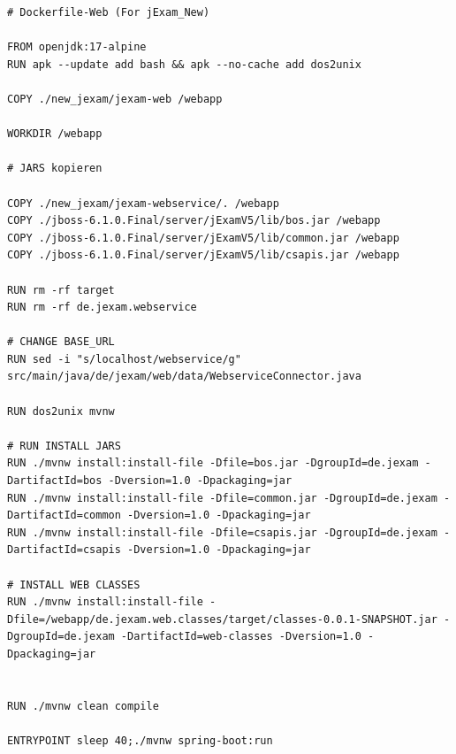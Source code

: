 \begin{lstlisting}[label={lst:docker-file-web}, caption={Dockerfile Datei des jExam_New Container}]
# Dockerfile-Web (For jExam_New)

FROM openjdk:17-alpine
RUN apk --update add bash && apk --no-cache add dos2unix

COPY ./new_jexam/jexam-web /webapp

WORKDIR /webapp

# JARS kopieren

COPY ./new_jexam/jexam-webservice/. /webapp
COPY ./jboss-6.1.0.Final/server/jExamV5/lib/bos.jar /webapp
COPY ./jboss-6.1.0.Final/server/jExamV5/lib/common.jar /webapp
COPY ./jboss-6.1.0.Final/server/jExamV5/lib/csapis.jar /webapp

RUN rm -rf target
RUN rm -rf de.jexam.webservice

# CHANGE BASE_URL
RUN sed -i "s/localhost/webservice/g"  src/main/java/de/jexam/web/data/WebserviceConnector.java

RUN dos2unix mvnw

# RUN INSTALL JARS
RUN ./mvnw install:install-file -Dfile=bos.jar -DgroupId=de.jexam -DartifactId=bos -Dversion=1.0 -Dpackaging=jar
RUN ./mvnw install:install-file -Dfile=common.jar -DgroupId=de.jexam -DartifactId=common -Dversion=1.0 -Dpackaging=jar
RUN ./mvnw install:install-file -Dfile=csapis.jar -DgroupId=de.jexam -DartifactId=csapis -Dversion=1.0 -Dpackaging=jar

# INSTALL WEB CLASSES
RUN ./mvnw install:install-file -Dfile=/webapp/de.jexam.web.classes/target/classes-0.0.1-SNAPSHOT.jar -DgroupId=de.jexam -DartifactId=web-classes -Dversion=1.0 -Dpackaging=jar


RUN ./mvnw clean compile

ENTRYPOINT sleep 40;./mvnw spring-boot:run
\end{lstlisting}


